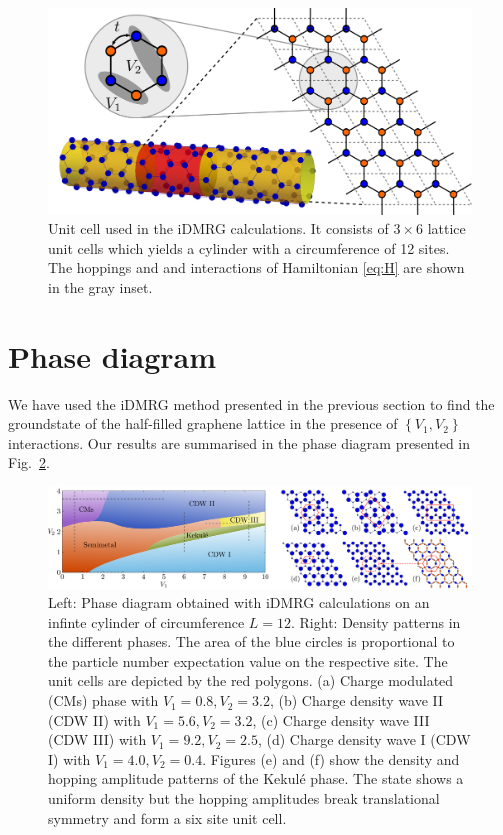 \documentclass[aps,prx,10pt,twocolumn,floatfix,superscriptaddress,showpacs,numerical,footinbib]{revtex4-1}
\begin{document}
\begin{figure}
 \includegraphics[width=\columnwidth]{pdf/unit_cell.pdf}
 \caption{Unit cell used in the iDMRG calculations. It consists of $3 \times 6$ lattice unit cells which yields a cylinder with a circumference of 12 sites. The hoppings and and interactions of Hamiltonian \eqref{eq:H} are shown in the gray inset.  \label{fig:Defs}}
\end{figure}
\section{Phase diagram}
%
We have used the iDMRG method presented in the previous section
to find the groundstate of the half-filled graphene lattice in the presence of 
$\left\lbrace V_{1},V_{2}\right\rbrace$ interactions.
%
Our results are summarised in the phase diagram presented in Fig.~\ref{fig:phase diagram}.

\begin{figure}
 \includegraphics[width=\textwidth]{pdf/phase_diagram_ext.pdf}
 \caption{Left: Phase diagram obtained with iDMRG calculations on an infinte cylinder of circumference $L=12$. Right: Density patterns in the different phases. The area of the blue circles is proportional to the particle number expectation value on the respective site. The unit cells are depicted by the red polygons. (a) Charge modulated (CMs) phase with $V_1 = 0.8, V_2 = 3.2 $, (b) Charge density wave II (CDW II) with $V_1 = 5.6, V_2 = 3.2$,  (c) Charge density wave III (CDW III) with $V_1 = 9.2, V_2 = 2.5$, (d) Charge density wave I (CDW I) with $V_1 = 4.0, V_2 = 0.4 $. Figures (e) and (f) show the density and hopping amplitude patterns of the Kekul\'e phase. The state shows a uniform density but the hopping amplitudes break translational symmetry and form a six site unit cell. \label{fig:phase diagram}}
\end{figure}
\end{document}
